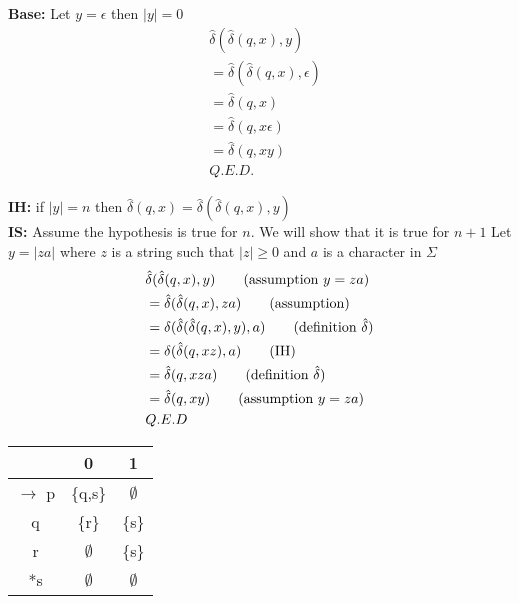 \documentclass[12pt,a4paper]{article}
\begin{document}
\noindent
\textbf{Base:} Let $ y=\epsilon $ then $ |y|=0$
\begin{align*}
&\hat{\delta}(\hat{\delta}(q,x),y)		\tag{assumption}
\\ &=\hat{\delta}(\hat{\delta}(q,x),\epsilon)	\tag{definition}
\\ &=\hat{\delta}(q,x)					\tag{definition}
\\ &=\hat{\delta}(q,x\epsilon)			\tag{definition}
\\ &=\hat{\delta}(q,xy) 				\tag{assumption}
\\ &Q.E.D.
\end{align*}

\noindent
\textbf{IH:} if $|y|=n$ then $\hat{\delta}(q,x)=\hat{\delta}(\hat{\delta}(q,x),y)$\\

\noindent
\textbf{IS:} Assume the hypothesis is true for $n$. We will show that it is true for $n+1$ 
\noindent
Let $y=|za|$ where $z$ is a string such that $|z| \ge 0$ and $a$ is a character in $\Sigma$
\begin{align*}
&\hat{\delta}(\hat{\delta}(q,x),y)				\tag{assumption $y=za$}
\\ &= \hat{\delta}(\hat{\delta}(q,x),za) 		\tag{assumption}
\\ &= \delta(\hat{\delta}(\hat{\delta}(q,x),y),a) \tag{definition $\hat{\delta}$}
\\ &= \delta(\hat{\delta}(q,xz),a)				\tag{IH}
\\ &= \hat{\delta}(q,xza)						\tag{definition $\hat{\delta}$}
\\ &= \hat{\delta}(q,xy)						\tag{assumption $y=za$}
\\ &Q.E.D
\end{align*}

\begin{table}[h]
	\centering
	\begin{tabular}{|c|c|c|}
		\hline
		 & 0 & 1 \\
		\hline
		$\rightarrow$ p & \{q,s\} & $\emptyset$\\
		q & \{r\} & \{s\}\\
		r & $\emptyset$ & \{s\}\\
		*s & $\emptyset$ & $\emptyset$\\
		\hline
	\end{tabular}
\end{table}
\end{document}
